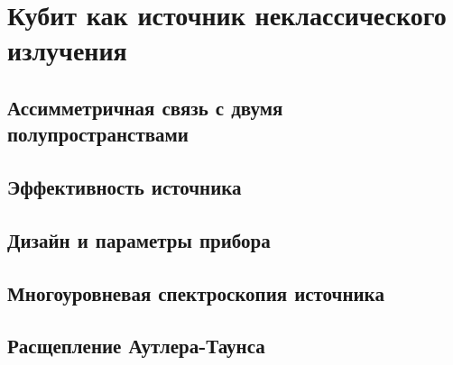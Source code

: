 \chapter{Кубит как источник неклассического излучения}
\section{Ассимметричная связь с двумя полупространствами}
\section{Эффективность источника}
\section{Дизайн и параметры прибора}
\section{Многоуровневая спектроскопия источника}
\section{Расщепление Аутлера-Таунса}